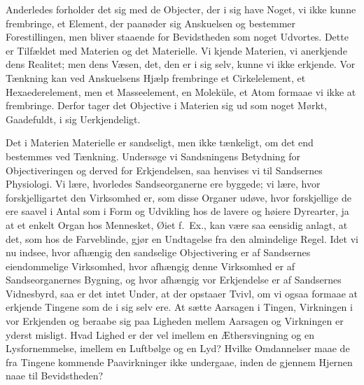 \documentclass[12pt]{book}
\newcommand{\apage}[1]{\marginnote{\footnotesize\textit{[#1]}}}
\begin{document}
Anderledes forholder det sig med de Objecter, der i sig have Noget, vi
ikke kunne frembringe, et Element, der paanøder sig Anskuelsen og bestemmer
Forestillingen, men bliver staaende for Bevidstheden \apage{51} som noget Udvortes.
Dette er Tilfældet med Materien og det Materielle. Vi kjende Materien, vi
anerkjende dens Realitet; men dens Væsen, det, den er i sig selv, kunne vi
ikke erkjende. Vor Tænkning kan ved Anskuelsens Hjælp frembringe et
Cirkelelement, et Hexaederelement, men et Masseelement, en Moleküle, et
Atom formaae vi ikke at frembringe. Derfor tager det Objective i Materien
sig ud som noget Mørkt, Gaadefuldt, i sig Uerkjendeligt.

Det i Materien Materielle er sandseligt, men ikke tænkeligt, om det end
bestemmes ved Tænkning. Undersøge vi Sandsningens Betydning for
Objectiveringen og derved for Erkjendelsen, saa henvises vi til Sandsernes
Physiologi. Vi lære, hvorledes Sandseorganerne ere byggede; vi lære, hvor
forskjelligartet den Virksomhed er, som disse Organer udøve, hvor
forskjellige de ere saavel i Antal som i Form og Udvikling hos de lavere
og høiere Dyrearter, ja at et enkelt Organ hos Mennesket, Øiet f.\ Ex.,
kan være saa eensidig anlagt, at det, som hos de Farveblinde, gjør en
Undtagelse fra den almindelige Regel. Idet vi nu indsee, hvor afhængig den
sandselige Objectivering er af Sandsernes eiendommelige Virksomhed, hvor
afhængig denne Virksomhed er af Sandseorganernes Bygning, og hvor afhængig
vor Erkjendelse er af Sandsernes Vidnesbyrd, saa er det intet Under, at
der opstaaer Tvivl, om vi ogsaa formaae at erkjende Tingene som de i sig
selv ere. At sætte Aarsagen i Tingen, Virkningen i vor Erkjenden og
beraabe sig paa Ligheden mellem Aarsagen og Virkningen er yderst  \apage{52} misligt.
Hvad Lighed er der vel imellem en Æthersvingning og en Lysfornemmelse,
imellem en Luftbølge og en Lyd? Hvilke Omdannelser maae de fra Tingene
kommende Paavirkninger ikke undergaae, inden de gjennem Hjernen naae til
Bevidstheden?
\end{document}

